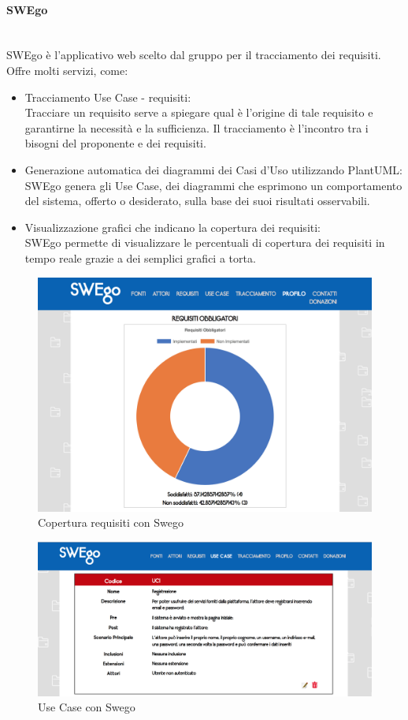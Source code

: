 		\paragraph{SWEgo}
		\label {sec:SWEgo}
		\mbox{}\\
		SWEgo è l'applicativo web scelto dal gruppo per il tracciamento dei requisiti. Offre molti servizi, come:
		\begin{itemize}
			\item Tracciamento Use Case - requisiti:\\
			Tracciare un requisito serve a spiegare qual è l'origine di tale requisito e garantirne la necessità e la sufficienza. Il tracciamento è l'incontro tra i bisogni del proponente e dei requisiti.
			\item Generazione automatica dei diagrammi dei Casi d'Uso utilizzando PlantUML:\\
			SWEgo genera gli Use Case, dei diagrammi che esprimono un comportamento del sistema, offerto o desiderato, sulla base dei suoi risultati osservabili.
			\item Visualizzazione grafici che indicano la copertura dei requisiti: \\
			SWEgo permette di visualizzare le percentuali di copertura dei requisiti in tempo reale grazie a dei semplici grafici a torta.
		\end{itemize}
		\begin{figure}[h]
		\label{figuraSwego}
		\centering 
		\includegraphics[width=1\textwidth]{images/swego1.png}
		\caption{Copertura requisiti con Swego} %
		\end{figure}
	
	\begin{figure}[h]
	\label{figuraSwego}
	\centering 
	\includegraphics[width=1\textwidth]{images/swego2.png}
	\caption{Use Case con Swego} %
	\end{figure}
			
			
